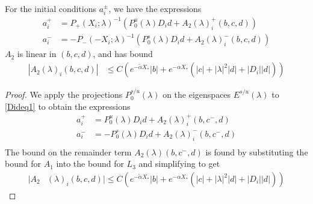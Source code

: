 \documentclass[thesis.tex]{subfiles}
\begin{document}
\begin{lemma}\label{lemma:aipm}
For the initial conditions $a_i^\pm$, we have the expressions
\begin{equation}\label{aipmexp1}
\begin{aligned}
a_i^+ &= P_+(X_i; \lambda)^{-1} \left( P_0^u(\lambda) D_i d + A_2(\lambda)_i^+(b, c, d) \right) \\
a_i^- &= -P_-(-X_i; \lambda)^{-1} \left( P_0^s(\lambda) D_i d + A_2(\lambda)_i^-(b, c, d) \right)
\end{aligned}
\end{equation}
$A_2$ is linear in $(b, c, d)$, and has bound
\begin{align}
|A_2(\lambda)_i(b, c, d)|
&\leq C \left(e^{-\tilde{\alpha} X_*}|b| + e^{-\alpha X_*}(|c| + |\lambda|^2|d| + |D_i||d|) \right) \label{A2bound}
\end{align}

\begin{proof}
We apply the projections $P_0^{s/u}(\lambda)$ on the eigenspaces $E^{s/u}(\lambda)$ to \eqref{Dideq1} to obtain the expressions
\begin{align*}
a_i^+ &= P_0^u(\lambda) D_i d + A_2(\lambda)_i^+(b, c^-, d) \\
a_i^- &= -P_0^s(\lambda) D_i d + A_2(\lambda)_i^-(b, c^-, d) \\
\end{align*}
The bound on the remainder term $A_2(\lambda)(b, c^-, d)$ is found by substituting the bound for $A_1$ into the bound for $L_3$ and simplifying to get
\begin{align*}
|A_2&(\lambda)_i(b, c, d)| \leq C \left(e^{-\tilde{\alpha} X_*}|b| + e^{-\alpha X_*}(|c| + |\lambda|^2|d| + |D_i||d|) \right)
\end{align*} 


\end{proof}
\end{lemma}
\end{document}
